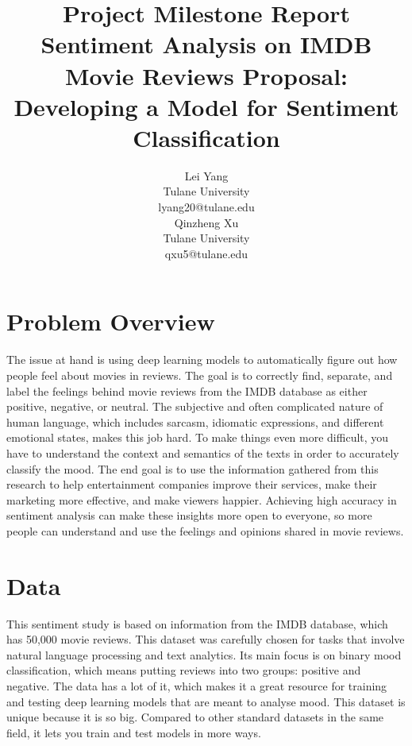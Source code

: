 \documentclass[11pt,a4paper]{article}
\title{Project Milestone Report\\
{\large Sentiment Analysis on IMDB Movie Reviews Proposal: Developing a Model for Sentiment Classification}}
\author{Lei Yang \\
  Tulane University \\
  {lyang20@tulane.edu} \\\And
  Qinzheng Xu \\
  Tulane University \\
  {qxu5@tulane.edu} \\}
\date{}
\begin{document}
\maketitle


\section{Problem Overview}

The issue at hand is using deep learning models to automatically figure out how people feel about movies in reviews. The goal is to correctly find, separate, and label the feelings behind movie reviews from the IMDB database as either positive, negative, or neutral. The subjective and often complicated nature of human language, which includes sarcasm, idiomatic expressions, and different emotional states, makes this job hard. To make things even more difficult, you have to understand the context and semantics of the texts in order to accurately classify the mood. The end goal is to use the information gathered from this research to help entertainment companies improve their services, make their marketing more effective, and make viewers happier. Achieving high accuracy in sentiment analysis can make these insights more open to everyone, so more people can understand and use the feelings and opinions shared in movie reviews.



\section{Data}

This sentiment study is based on information from the IMDB database, which has 50,000 movie reviews. This dataset was carefully chosen for tasks that involve natural language processing and text analytics. Its main focus is on binary mood classification, which means putting reviews into two groups: positive and negative. The data has a lot of it, which makes it a great resource for training and testing deep learning models that are meant to analyse mood. This dataset is unique because it is so big. Compared to other standard datasets in the same field, it lets you train and test models in more ways.
\end{document}
